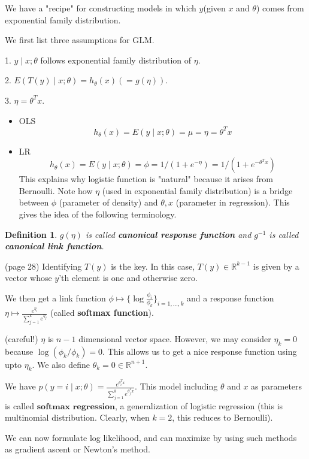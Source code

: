 \documentclass{article}
\newtheorem{definition}{Definition}
\theoremstyle{remark}
\begin{document}
We have a "recipe" for constructing models in which $y$(given $x$ and $\theta$) comes from exponential family distribution.

We first list three assumptions for GLM.

1. $y\mid x;\theta$ follows exponential family distribution of $\eta$.

2. $E(T(y)\mid x;\theta)=h_\theta(x)(=g(\eta))$.

3. $\eta = \theta^T x$.

\begin{itemize}
\item OLS $$h_\theta(x)=E(y\mid x;\theta)=\mu=\eta=\theta^T x$$
\item LR $$h_\theta (x)=E(y\mid x;\theta)=\phi=1/(1+e^{-\eta})=1/(1+e^{-\theta^T x})$$This explains why logistic function is "natural" because it arises from Bernoulli. Note how $\eta$ (used in exponential family distribution) is a bridge between $\phi$ (parameter of density) and $\theta, x$ (parameter in regression). This gives the idea of the following terminology.
\end{itemize}

\begin{definition}
$g(\eta)$ is called \textbf{canonical response function} and $g^{-1}$ is called \textbf{canonical link function}.
\end{definition}

(page 28) Identifying $T(y)$ is the key. In this case, $T(y)\in \mathbb{R}^{k-1}$ is given by a vector whose $y$'th element is one and otherwise zero.

We then get a link function $\phi\mapsto \{\log \frac{\phi_i}{\phi_k}\}_{i=1,\dots,k}$ and a response function $\eta\mapsto\frac{e^{\eta_i}}{\sum^k_{j=1}e^{\eta_j}}$ (called \textbf{softmax function}).

(careful!) $\eta$ is $n-1$ dimensional vector space. However, we may consider $\eta_k=0$ because $\log (\phi_k/\phi_k)=0$. This allows us to get a nice response function using upto $\eta_k$. We also define $\theta_k=0\in\mathbb{R}^{n+1}$.

We have $p(y=i\mid x;\theta)=\frac{e^{\theta_i^T x}}{\sum_{j=1}^k e^{\theta_j^T x}}$. This model including $\theta$ and $x$ as parameters is called $\textbf{softmax regression}$, a generalization of logistic regression (this is multinomial distribution. Clearly, when $k=2$, this reduces to Bernoulli). 

We can now formulate log likelihood, and can maximize by using such methods as gradient ascent or Newton's method.
\end{document}
